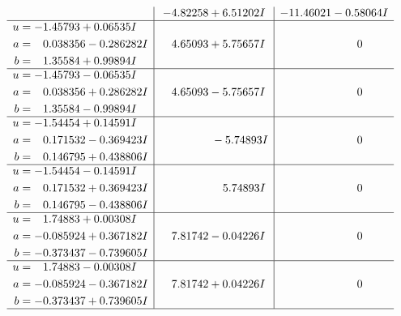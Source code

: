 \documentclass[1p]{elsarticle_modified}
\theoremstyle{definition}
\begin{document}
$$\begin{array}{c|c|c}
 & -4.82258 + 6.51202 I & -11.46021 - 0.58064 I \\ \hline\begin{aligned}
u &= -1.45793 + 0.06535 I \\
a &= \phantom{-}0.038356 - 0.286282 I \\
b &= \phantom{-}1.35584 + 0.99894 I\end{aligned}
 & \phantom{-}4.65093 + 5.75657 I & \phantom{-0.000000 } 0 \\ \hline\begin{aligned}
u &= -1.45793 - 0.06535 I \\
a &= \phantom{-}0.038356 + 0.286282 I \\
b &= \phantom{-}1.35584 - 0.99894 I\end{aligned}
 & \phantom{-}4.65093 - 5.75657 I & \phantom{-0.000000 } 0 \\ \hline\begin{aligned}
u &= -1.54454 + 0.14591 I \\
a &= \phantom{-}0.171532 - 0.369423 I \\
b &= \phantom{-}0.146795 + 0.438806 I\end{aligned}
 & \phantom{-0.000000 } -5.74893 I & \phantom{-0.000000 } 0 \\ \hline\begin{aligned}
u &= -1.54454 - 0.14591 I \\
a &= \phantom{-}0.171532 + 0.369423 I \\
b &= \phantom{-}0.146795 - 0.438806 I\end{aligned}
 & \phantom{-0.000000 -}5.74893 I & \phantom{-0.000000 } 0 \\ \hline\begin{aligned}
u &= \phantom{-}1.74883 + 0.00308 I \\
a &= -0.085924 + 0.367182 I \\
b &= -0.373437 - 0.739605 I\end{aligned}
 & \phantom{-}7.81742 - 0.04226 I & \phantom{-0.000000 } 0 \\ \hline\begin{aligned}
u &= \phantom{-}1.74883 - 0.00308 I \\
a &= -0.085924 - 0.367182 I \\
b &= -0.373437 + 0.739605 I\end{aligned}
 & \phantom{-}7.81742 + 0.04226 I & \phantom{-0.000000 } 0\\
 \hline 
 \end{array}$$\newpage$$\begin{array}{c|c|c}  

\end{array}$$
\end{document}
